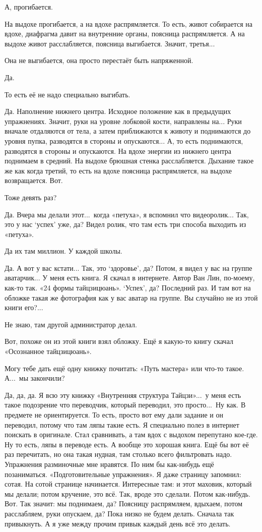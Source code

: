 \M
А, прогибается.

\I
На выдохе прогибается, а на вдохе распрямляется. То есть, живот собирается на вдохе,
диафрагма давит на внутренние органы, поясница распрямляется.
А на выдохе живот расслабляется, поясница выгибается. Значит, третья...

\M
Она не выгибается, она просто перестаёт быть напряженной.

\I
Да. 

\M
То есть её не надо
специально выгибать.

\I
Да. Наполнение нижнего центра. Исходное положение как в предыдущих упражнениях.
Значит, руки на уровне лобковой кости, направлены на... Руки вначале отдаляются от тела,
а затем приближаются к животу и поднимаются до уровня пупка, разводятся
в стороны и опускаются... А, то есть поднимаются, разводятся в стороны и опускаются.
На вдохе энергии из нижнего центра поднимаем в средний.
На выдохе брюшная стенка расслабляется. Дыхание такое
же как когда третий, то есть на вдохе поясница
распрямляется, на выдохе возвращается. Вот.

\M
Тоже девять раз?

\I
Да. Вчера мы делали этот...\ когда «петуха», я вспомнил что видеоролик...
Так, это у нас `успех' уже, да? Видел ролик, что там
есть три способа выходить из «петуха».

\M
Да их там миллион. У каждой школы.

\I
Да. А вот у вас кстати... Так, это `здоровье', да?
Потом, я видел у
вас на группе аватарчик...
У меня есть книга. Я скачал в интернете. Автор Ван Лин, по-моему, как-то так.
«24 формы тайцзицюань». `Успех', да? Последний раз. И там вот на обложке такая же фотография
как у вас аватар на группе. Вы случайно не из этой книги его?...

\M
Не знаю, там другой администратор делал.

\I
Вот, похоже он из этой книги взял обложку.
Ещё я какую-то
книгу скачал «Осознанное тайцзицюань».

\M
Могу тебе дать ещё одну книжку почитать: «Путь мастера» или что-то такое.
А...\ мы закончили?

\I
Да, да, да.
Я всю эту книжку «Внутренняя структура Тайцзи»...\ у меня есть такое подозрение что переводчик,
который переводил, это просто...\ Ну как. В предмете не ориентируется.
То есть, просто вот ему дали задание и он переводил, потому что там ляпы такие есть.
Я специально полез в интернет поискать в оригинале. Стал сравнивать, а там вдох с выдохом
перепутано кое-где. Ну то есть, ляпы в переводе есть. А вообще это хорошая книга.
Ещё бы вот её раз перечитать, но она такая нудная, там столько всего фильтровать надо.
Упражнения разминочные мне нравятся.
По ним бы как-нибудь ещё позаниматься.
«Подготовительные упражнения».
Я даже страницу запомнил: сотая.
На сотой странице начинается. Интересные там: и этот маховик, который мы делали; потом кручение,
это всё. Так, вроде это сделали.
Потом как-нибудь. Вот. Так значит: мы поднимаем, да? Поясницу распрямляем, вдыхаем,
потом расслабляем, руки опускаем, да?
Пока низко не будем делать. Сначала так привыкнуть.
А я уже между прочим
привык каждый день всё
это делать.

